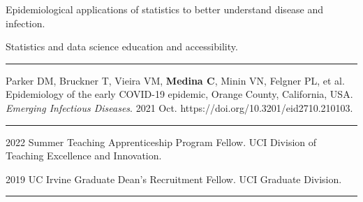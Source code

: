 \documentclass{article}
\begin{document}


\begin{description}
	\vspace{-2mm}
	\item[Research Interests]\hspace*{.1in}
		
		Epidemiological applications of statistics to better understand disease and infection.
		\vspace*{1mm}
		
		Statistics and data science education and accessibility.
		
\end{description}
\vspace{-2mm}
\rule{\linewidth}{1pt}




\begin{description}
	\vspace{-2mm}
	\item[Publications]\hspace*{.1in} 
	
		Parker DM, Bruckner T, Vieira VM, \textbf{Medina C}, Minin VN, Felgner PL, et al. Epidemiology of the early COVID-19 epidemic, Orange County, California, USA. \textit{Emerging Infectious Diseases}. 2021 Oct. https://doi.org/10.3201/eid2710.210103. 

\end{description}
\vspace{-2mm}
\rule{\linewidth}{1pt}





\begin{description}
	\vspace{-2mm}
	\item[Fellowships]\hspace*{.1in}

		2022 Summer Teaching Apprenticeship Program Fellow. UCI Division of Teaching Excellence and Innovation.
		\vspace*{1mm}
		
		2019 UC Irvine Graduate Dean's Recruitment Fellow. UCI Graduate Division.

\end{description}
\vspace{-2mm}
\rule{\linewidth}{1pt}


\end{document}
